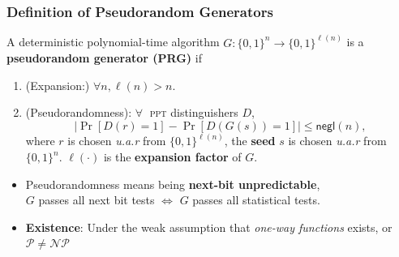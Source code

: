 \begin{frame}\frametitle{Definition of Pseudorandom Generators}
\begin{definition}\label{def:pg}
A deterministic polynomial-time algorithm $G : \{0,1\}^n \to \{0,1\}^{\ell(n)}$ is a \textbf{pseudorandom generator (PRG)} if
\begin{enumerate}
\item (Expansion:) $\forall n, \ell(n) > n$.
\item (Pseudorandomness): $\forall\;$ \textsc{ppt} distinguishers $D$,
\[ \left|\Pr[D(r)=1] - \Pr[D(G(s))=1]\right| \le \mathsf{negl}(n),
\]
where $r$ is chosen \emph{u.a.r} from $\{0,1\}^{\ell(n)}$, the \textbf{seed} $s$ is chosen \emph{u.a.r} from $\{0,1\}^n$. $\ell(\cdot)$ is the \textbf{expansion factor} of $G$.
\end{enumerate}
\end{definition}
\begin{itemize}
\item Pseudorandomness means being \textbf{next-bit unpredictable},\\
$G$ passes all next bit tests $\iff$ $G$ passes all statistical tests.
\item \textbf{Existence}: Under the weak assumption that \emph{one-way functions} exists, or $\mathcal{P} \ne \mathcal{NP}$
\end{itemize}
\end{frame}

